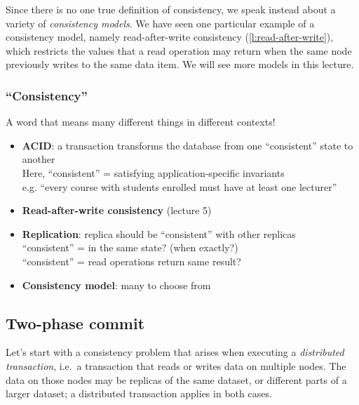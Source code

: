 Since there is no one true definition of consistency, we speak instead about a variety of \emph{consistency models}.
We have seen one particular example of a consistency model, namely read-after-write consistency (\autoref{l:read-after-write}), which restricts the values that a read operation may return when the same node previously writes to the same data item.
We will see more models in this lecture.

\begin{frame}
    \label{s:consistency}
    \frametitle{``Consistency''}
    A word that means many different things in different contexts!\pause
    \begin{itemize}
        \item \textbf{ACID}: a transaction transforms the database from one ``consistent'' state to another\\[0.5em]\pause
            Here, ``consistent'' = satisfying application-specific invariants\\[0.5em]
            e.g. ``every course with students enrolled must have at least one lecturer''\\[0.5em]\pause
        \item \textbf{Read-after-write consistency} (lecture 5)\\[0.5em]\pause
        \item \textbf{Replication}: replica should be ``consistent'' with other replicas\\[0.5em]\pause
            ``consistent'' = in the same state? (when exactly?)\\[0.5em]
            ``consistent'' = read operations return same result?\\[0.5em]
        \item \textbf{Consistency model}: many to choose from
    \end{itemize}
\end{frame}
\label{l:consistency}

\subsection{Two-phase commit}\label{sec:2pc}

Let's start with a consistency problem that arises when executing a \emph{distributed transaction}, i.e.\ a transaction that reads or writes data on multiple nodes.
The data on those nodes may be replicas of the same dataset, or different parts of a larger dataset; a distributed transaction applies in both cases.

